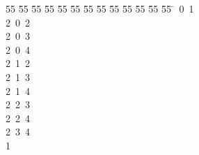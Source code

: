 %
%
\begin{tabbing}
55 \= 55 \= 55 \= 55 \= 55 \= 55 \= 55 \= 55 \= 55 \= 55 \= 55 \= 55 \= 55 \= \ 0\ 1\\[0pt]
2\ 0\ 2\\[0pt]
2\ 0\ 3\\[0pt]
2\ 0\ 4\\[0pt]
2\ 1\ 2\\[0pt]
2\ 1\ 3\\[0pt]
2\ 1\ 4\\[0pt]
2\ 2\ 3\\[0pt]
2\ 2\ 4\\[0pt]
2\ 3\ 4\\[0pt]
1\\[0pt]
\end{tabbing}
